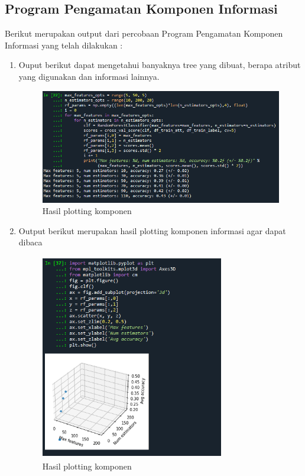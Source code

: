 \subsection{Program Pengamatan Komponen Informasi}
Berikut merupakan output dari percobaan Program Pengamatan Komponen Informasi yang telah dilakukan :
\begin{enumerate}
    \item Ouput berikut dapat mengetahui banyaknya tree yang dibuat, berapa atribut yang digunakan dan informasi lainnya.
    \begin{figure}
        \centering
        \includegraphics[width=11cm,height=5cm]{figures/komponen_informasi.PNG}
        \caption{Hasil plotting komponen}
        \label{penanda}
    \end{figure}
    \item Output berikut merupakan hasil plotting komponen informasi agar dapat dibaca
    \begin{figure}
        \centering
        \includegraphics[width=8cm,height=9cm]{figures/plot_komponen.PNG}
        \caption{Hasil plotting komponen}
        \label{penanda}
    \end{figure}
\end{enumerate}

